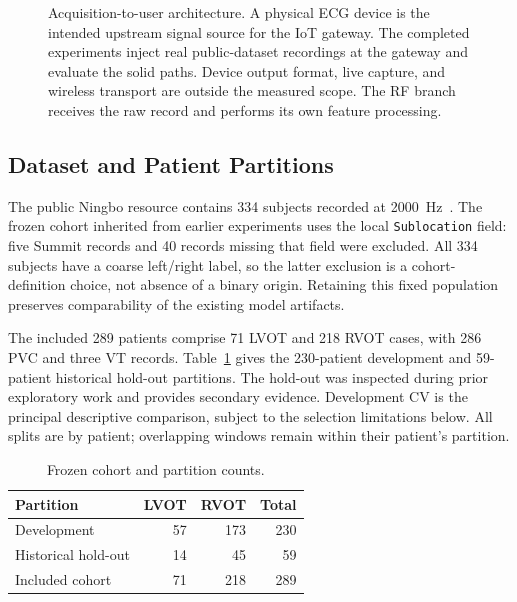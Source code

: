 \documentclass[conference,a4paper]{IEEEtran}
\begin{document}
\begin{figure}[t]
{}
\caption{Acquisition-to-user architecture. A physical ECG device is the intended upstream signal source for the IoT gateway. The completed experiments inject real public-dataset recordings at the gateway and evaluate the solid paths. Device output format, live capture, and wireless transport are outside the measured scope. The RF branch receives the raw record and performs its own feature processing.}
\label{fig:system}
\end{figure}

\subsection{Dataset and Patient Partitions}
The public Ningbo resource contains 334 subjects recorded at 2000~Hz~\cite{zheng2020}. The frozen cohort inherited from earlier experiments uses the local \texttt{Sublocation} field: five Summit records and 40 records missing that field were excluded. All 334 subjects have a coarse left/right label, so the latter exclusion is a cohort-definition choice, not absence of a binary origin. Retaining this fixed population preserves comparability of the existing model artifacts.

The included 289 patients comprise 71 LVOT and 218 RVOT cases, with 286 PVC and three VT records. Table~\ref{tab:cohort} gives the 230-patient development and 59-patient historical hold-out partitions. The hold-out was inspected during prior exploratory work and provides secondary evidence. Development CV is the principal descriptive comparison, subject to the selection limitations below. All splits are by patient; overlapping windows remain within their patient's partition.

\begin{table}[t]
\caption{Frozen cohort and partition counts.}
\label{tab:cohort}\centering
\begin{tabular}{lrrr}\toprule
Partition & LVOT & RVOT & Total\\\midrule
Development & 57 & 173 & 230\\
Historical hold-out & 14 & 45 & 59\\\midrule
Included cohort & 71 & 218 & 289\\\bottomrule
\end{tabular}
\end{table}
\end{document}
